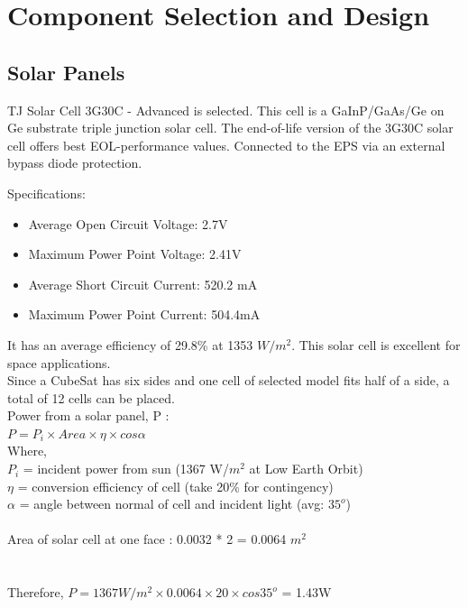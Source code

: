 \chapter{Component Selection and Design}
\justifying
\section[Solar Panels]{Solar Panels}
 TJ Solar Cell 3G30C - Advanced is selected. This cell is a GaInP/GaAs/Ge on Ge substrate triple junction solar cell. The end-of-life version of the 3G30C solar cell offers best EOL-performance
 values. Connected to the EPS via an external bypass diode protection.
 
 Specifications:
 \begin{itemize}
 	\item Average Open Circuit Voltage: 2.7V
 	\item Maximum Power Point Voltage: 2.41V
 	\item Average Short Circuit Current: 520.2 mA
 	\item Maximum Power Point Current: 504.4mA
 \end{itemize}
It has an average efficiency of 29.8\% at 1353 $W/m^{2}$. This solar cell is excellent for space applications. 
\\

Since a CubeSat has six sides and one cell of selected model fits half of a side, a total of 12 cells can be placed.\\ 

Power from a solar panel, P :\\
\hspace*{2cm} $P = P_{i} \times Area \times \eta  \times cos \alpha $ 
\\
 Where, \\
 $P_{i}$ = incident power from sun (1367 W/$m^2$ at Low Earth Orbit)
\\  $\eta$ = conversion efficiency of cell (take 20\% for contingency)
\\  $\alpha$ = angle between normal of cell and incident light (avg: $35^{o} $)\\ \\
Area of solar cell at one face : 0.0032 * 2 = 0.0064 $m^2$\\
\\ \\ Therefore, $P = 1367 W/m^2 \times 0.0064 \times 20  \times cos 35^{o} $ = 1.43W\\

